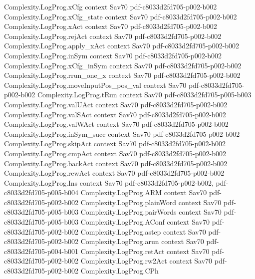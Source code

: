 \begin{theorem}
  {Complexity.LogProg.xCfg}
  {context}
  {Sav70}
  {pdf-c8033d2fd705-p002-b002}
\proofstep
  {Complexity.LogProg.xCfg_state}
  {context}
  {Sav70}
  {pdf-c8033d2fd705-p002-b002}
\proofstep
  {Complexity.LogProg.xAct}
  {context}
  {Sav70}
  {pdf-c8033d2fd705-p002-b002}
\proofstep
  {Complexity.LogProg.rejAct}
  {context}
  {Sav70}
  {pdf-c8033d2fd705-p002-b002}
\proofstep
  {Complexity.LogProg.apply_xAct}
  {context}
  {Sav70}
  {pdf-c8033d2fd705-p002-b002}
\proofstep
  {Complexity.LogProg.inSym}
  {context}
  {Sav70}
  {pdf-c8033d2fd705-p002-b002}
\proofstep
  {Complexity.LogProg.xCfg_inSym}
  {context}
  {Sav70}
  {pdf-c8033d2fd705-p002-b002}
\proofstep
  {Complexity.LogProg.rrun_one_x}
  {context}
  {Sav70}
  {pdf-c8033d2fd705-p002-b002}
\proofstep
  {Complexity.LogProg.moveInputPos_pos_val}
  {context}
  {Sav70}
  {pdf-c8033d2fd705-p002-b002}
\proofstep
  {Complexity.LogProg.tRun}
  {context}
  {Sav70}
  {pdf-c8033d2fd705-p005-b003}
\proofstep
  {Complexity.LogProg.valUAct}
  {context}
  {Sav70}
  {pdf-c8033d2fd705-p002-b002}
\proofstep
  {Complexity.LogProg.valSAct}
  {context}
  {Sav70}
  {pdf-c8033d2fd705-p002-b002}
\proofstep
  {Complexity.LogProg.valWAct}
  {context}
  {Sav70}
  {pdf-c8033d2fd705-p002-b002}
\proofstep
  {Complexity.LogProg.inSym_succ}
  {context}
  {Sav70}
  {pdf-c8033d2fd705-p002-b002}
\proofstep
  {Complexity.LogProg.skipAct}
  {context}
  {Sav70}
  {pdf-c8033d2fd705-p002-b002}
\proofstep
  {Complexity.LogProg.cmpAct}
  {context}
  {Sav70}
  {pdf-c8033d2fd705-p002-b002}
\proofstep
  {Complexity.LogProg.backAct}
  {context}
  {Sav70}
  {pdf-c8033d2fd705-p002-b002}
\proofstep
  {Complexity.LogProg.rewAct}
  {context}
  {Sav70}
  {pdf-c8033d2fd705-p002-b002}
\proofstep
  {Complexity.LogProg.Ins}
  {context}
  {Sav70}
  {pdf-c8033d2fd705-p002-b002,
    pdf-c8033d2fd705-p005-b004}
\proofstep
  {Complexity.LogProg.ARM}
  {context}
  {Sav70}
  {pdf-c8033d2fd705-p002-b002}
\proofstep
  {Complexity.LogProg.plainWord}
  {context}
  {Sav70}
  {pdf-c8033d2fd705-p005-b003}
\proofstep
  {Complexity.LogProg.pairWords}
  {context}
  {Sav70}
  {pdf-c8033d2fd705-p005-b003}
\proofstep
  {Complexity.LogProg.AConf}
  {context}
  {Sav70}
  {pdf-c8033d2fd705-p002-b002}
\proofstep
  {Complexity.LogProg.astep}
  {context}
  {Sav70}
  {pdf-c8033d2fd705-p002-b002}
\proofstep
  {Complexity.LogProg.arun}
  {context}
  {Sav70}
  {pdf-c8033d2fd705-p004-b001}
\proofstep
  {Complexity.LogProg.retAct}
  {context}
  {Sav70}
  {pdf-c8033d2fd705-p002-b002}
\proofstep
  {Complexity.LogProg.rw2Act}
  {context}
  {Sav70}
  {pdf-c8033d2fd705-p002-b002}
\proofstep
  {Complexity.LogProg.CPh}

\end{theorem}
